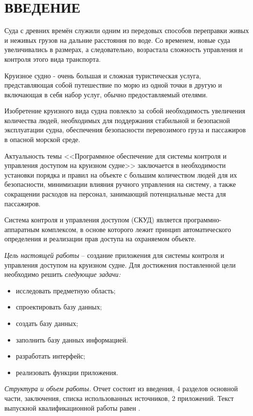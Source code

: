 \section*{ВВЕДЕНИЕ}
Суда с древних времён служили одним из передовых способов переправки живых и неживых грузов на дальние расстояния по воде. Со временем, новые суда увеличивались в размерах, а следовательно, возрастала сложность управления и контроля этого вида транспорта.

Круизное судно - очень большая и сложная туристическая услуга, представляющая собой путешествие по морю из одной точки в другую и включающая в себя набор услуг, обычно предоставляемый отелями.

Изобретение круизного вида судна повлекло за собой необходимость увеличения количества людей, необходимых для поддержания стабильной и безопасной эксплуатации судна, обеспечения безопасности перевозимого груза и пассажиров в опасной морской среде.

Актуальность темы <<Программное обеспечение для системы контроля и управления доступом на круизном судне>> заключается в необходимости установки порядка и правил на объекте с большим количеством людей для их безопасности, минимизации влияния ручного управления на систему, а также сокращении расходов на персонал, занимающий потенциальные места для пассажиров.

Система контроля и управления доступом (СКУД) является программно-аппаратным комплексом, в основе которого лежит принцип автоматического определения и реализации прав доступа на охраняемом объекте.

\emph{Цель настоящей работы} – создание приложения для системы контроля и управления доступом на круизном судне. Для достижения поставленной цели необходимо решить \emph{следующие задачи:}
\begin{itemize}
\item исследовать предметную область;
\item спроектировать базу данных;
\item создать базу данных;
\item заполнить базу данных информацией.
\item разработать  интерфейс;
\item реализовать функции приложения.
\end{itemize}

\emph{Структура и объем работы.} Отчет состоит из введения, 4 разделов основной части, заключения, списка использованных источников, 2 приложений. Текст выпускной квалификационной работы равен .

